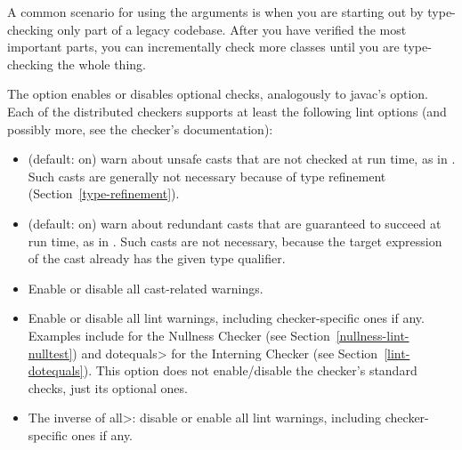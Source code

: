 A common scenario for using the arguments is when you are starting out by
type-checking only part of a legacy codebase.  After you have verified the
most important parts, you can incrementally check more classes until you
are type-checking the whole thing.



The  option enables or disables optional checks, analogously to
javac's  option.
Each of the distributed checkers supports at least the following lint
options (and possibly more, see the checker's documentation):




\begin{itemize}

\item
   (default: on) warn about unsafe casts that are not
  checked at run time, as in .  Such casts
  are generally not necessary because of type refinement
  (Section~\ref{type-refinement}).

\item
   (default: on) warn about redundant
  casts that are guaranteed to succeed at run time,
  as in .  Such casts are not necessary,
  because the target expression of the cast already has the given type
  qualifier.

\item
   Enable or disable all cast-related warnings.

\item
\begin{sloppypar}
   Enable or disable all lint warnings, including
  checker-specific ones if any.  Examples include  for the
  Nullness Checker (see Section~\ref{nullness-lint-nulltest}) and \<dotequals> for
  the Interning Checker (see Section~\ref{lint-dotequals}).  This option
  does not enable/disable the checker's standard checks, just its optional
  ones.
\end{sloppypar}

\item
   The inverse of \<all>:  disable or enable all lint warnings,
  including checker-specific ones if any.

\end{itemize}

